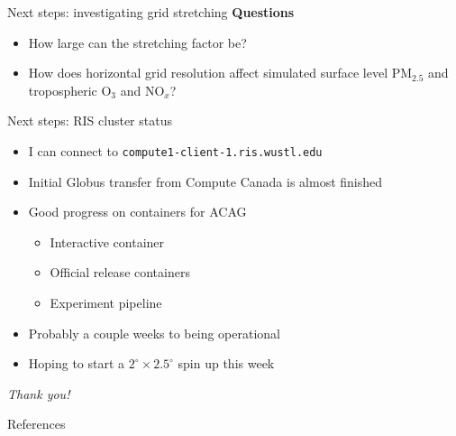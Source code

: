 \documentclass[10pt]{beamer}
\begin{document}
\begin{frame}{Next steps: investigating grid stretching}
    \footnotesize
    \textbf{Questions}
    \begin{itemize}
        \item How large can the stretching factor be?
        \item How does horizontal grid resolution affect simulated surface level PM$_{2.5}$ and tropospheric O$_3$ and NO$_x$?
    \end{itemize}
\end{frame}

\begin{frame}{Next steps: RIS cluster status}
    \begin{itemize}
        \item I can connect to \texttt{compute1-client-1.ris.wustl.edu}
        \vspace{0.4cm}
        \item Initial Globus transfer from Compute Canada is almost finished
        \vspace{0.4cm}
        \item Good progress on containers for ACAG
        \begin{itemize}
            \footnotesize
            \vspace{0.1cm}
            \item Interactive container
            \vspace{0.1cm}
            \item Official release containers
            \vspace{0.1cm}
            \item Experiment pipeline
        \end{itemize}
        \vspace{0.4cm}
        \item Probably a couple weeks to being operational
        \vspace{0.4cm}
        \item Hoping to start a $2^\circ \times 2.5^\circ$ spin up this week
    \end{itemize}
\end{frame}

\begin{frame}{}
  \centering \Large
  \emph{Thank you!}
\end{frame}

\begin{frame}[allowframebreaks]{References}
    \nocite{geos-chem_developers_narrative_2019}
    \nocite{geos-chem_developers_boundary_2019}
    \tiny
  
  

\end{frame}
\end{document}
